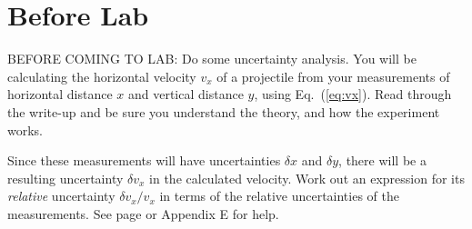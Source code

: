 \newexp

\section*{Before Lab}

BEFORE COMING TO LAB: Do some uncertainty analysis.  You
will be calculating the horizontal velocity $v_{x}$ of a
projectile from your measurements
of horizontal distance $x$ and vertical distance $y$, using
Eq.~(\ref{eq:vx}).  Read through the write-up and be sure you
understand the theory, and how the experiment works.

Since these measurements will
have uncertainties $\delta x$ and $\delta y$, there will be a
resulting
uncertainty $\delta v_{x}$ in the calculated velocity.  Work out an
expression for its {\em relative} uncertainty $\delta v_{x}/v_{x}$
in terms of the relative uncertainties of the measurements.  See page
\pageref{errorprop} or Appendix
E for help.



